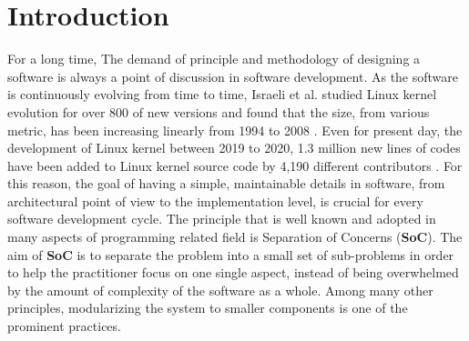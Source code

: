 \chapter*{Introduction}






For a long time, The demand of principle and methodology of designing a software is always a point of discussion in software development.
As the software is continuously evolving from time to time, Israeli et al. studied Linux kernel evolution for over 800 of new versions and found that the size, from various metric, has been increasing linearly from 1994 to 2008 \cite{10.1016/j.jss.2009.09.042}. Even for present day, the development of Linux kernel between 2019 to 2020, 1.3 million new lines of codes have been added to Linux kernel source code by 4,190 different contributors \cite{anderson2020}. For this reason, the goal of having a simple, maintainable details in software, from architectural point of view to the implementation level, is crucial for every software development cycle.
The principle that is well known and adopted in many aspects of programming related field is Separation of Concerns (\textbf{SoC}). The aim of \textbf{SoC} is to separate the problem into a small set of sub-problems in order to help the practitioner focus on one single aspect, instead of being overwhelmed by the amount of complexity of the software as a whole. Among many other principles, modularizing the system to smaller components is one of the prominent practices.

